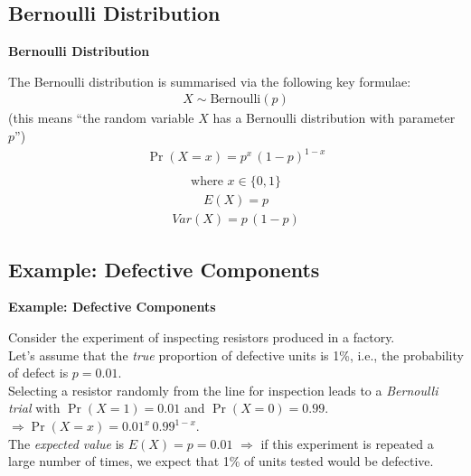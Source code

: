 \documentclass[compress]{beamer}        %
\makeatletter
\newcommand{\tcb}{\textcolor{beamer@blendedblue}}
\makeatother
\begin{document}
\subsection{Bernoulli Distribution}
\begin{frame}{\bf \tcb{Bernoulli Distribution}}

The Bernoulli distribution is summarised via the following key formulae:
\begin{align*}
\boxed{X \sim \text{Bernoulli}(p)}
\end{align*}
{\footnotesize(this means ``the random variable $X$ has a Bernoulli distribution with parameter $p$'')}
\begin{align*}
\boxed{\Pr(X = x) = p^x \, (1-p)^{1-x}}\\[-1cm]
\end{align*}
\begin{align*}
\text{where } \boxed{x \in \{0,1\}}
\end{align*}
\begin{align*}
\boxed{E(X) = p}
\end{align*}
\begin{align*}
\boxed{Var(X) = p\,(1-p)}
\end{align*}

\end{frame}


\subsection{Example: Defective Components}
\begin{frame}{\bf \tcb{Example: Defective Components}}

Consider the experiment of inspecting resistors produced in a factory.\\[0.7cm]

Let's assume that the \emph{true} proportion of defective units is 1\%, i.e., the probability of defect is $p = 0.01$.\\[0.7cm]

Selecting a resistor randomly from the line for inspection leads to a \emph{Bernoulli trial} with $\Pr(X=1) = 0.01$ and  $\Pr(X=0) = 0.99$.\\[0.3cm]
$\Rightarrow \Pr(X=x) = 0.01^x \, 0.99^{1-x}$.\\[0.7cm]

The \emph{expected value} is $E(X) = p = 0.01$ $\Rightarrow$ if this experiment is repeated a large number of times, we expect that 1\% of units tested would be defective.

\end{frame}
\end{document}

